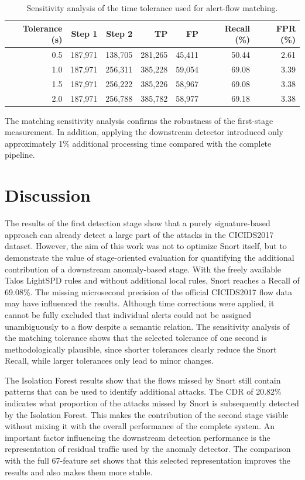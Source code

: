 \documentclass[conference]{IEEEtran}
\begin{document}
\begin{table}[htbp]
\centering
\caption{Sensitivity analysis of the time tolerance used for alert-flow matching.}
\label{tab:matching-tolerance}
\scriptsize
\begin{tabular}{rrrrrrr}
\toprule
Tolerance (s) & Step 1 & Step 2 & TP & FP & Recall (\%) & FPR (\%) \\
\midrule
0.5 & 187,971 & 138,705 & 281,265 & 45,411 & 50.44 & 2.61 \\
1.0 & 187,971 & 256,311 & 385,228 & 59,054 & 69.08 & 3.39 \\
1.5 & 187,971 & 256,222 & 385,226 & 58,967 & 69.08 & 3.38 \\
2.0 & 187,971 & 256,788 & 385,782 & 58,977 & 69.18 & 3.38 \\
\bottomrule
\end{tabular}
\end{table}

The matching sensitivity analysis confirms the robustness of the first-stage
measurement. In addition, applying the downstream detector introduced only
approximately 1\% additional processing time compared with the complete
pipeline.


\section{Discussion} 
\label{sec:discussion}
The results of the first detection stage show that a purely signature-based approach can already detect a large part of the attacks in the CICIDS2017 dataset. However, the aim of this work was not to optimize Snort itself, but to demonstrate the value of stage-oriented evaluation for quantifying the additional contribution of a downstream anomaly-based stage. With the freely available Talos LightSPD rules and without additional local rules, Snort reaches a Recall of 69.08\%.
The missing microsecond precision of the official CICIDS2017 flow data may have influenced the results. Although time corrections were applied, it cannot be fully excluded that individual alerts could not be assigned unambiguously to a flow despite a semantic relation. The sensitivity analysis of the matching tolerance shows that the selected tolerance of one second is methodologically plausible, since shorter tolerances clearly reduce the Snort Recall, while larger tolerances only lead to minor changes.

The Isolation Forest results show that the flows missed by Snort still contain patterns that can be used to identify additional attacks. The CDR of 20.82\% indicates what proportion of the attacks missed by Snort is subsequently detected by the Isolation Forest. This makes the contribution of the second stage visible without mixing it with the overall performance of the complete system. An important factor influencing the downstream detection performance is the
representation of residual traffic used by the anomaly detector. The comparison with the full 67-feature set shows that this selected representation improves the results and also makes them more stable.
\end{document}
